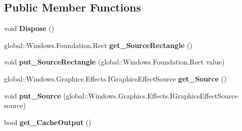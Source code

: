 \subsection*{Public Member Functions}
\begin{DoxyCompactItemize}
\item 
\mbox{\label{class_microsoft_1_1_graphics_1_1_canvas_1_1_effects_1_1_tile_effect_a82911fbdb206a47dd070948da25b15b2}} 
void {\bfseries Dispose} ()
\item 
\mbox{\label{class_microsoft_1_1_graphics_1_1_canvas_1_1_effects_1_1_tile_effect_ab1844baf6fd7b1291017af32256cb757}} 
global\+::\+Windows.\+Foundation.\+Rect {\bfseries get\+\_\+\+Source\+Rectangle} ()
\item 
\mbox{\label{class_microsoft_1_1_graphics_1_1_canvas_1_1_effects_1_1_tile_effect_a1a2a8a43669447290f1788aeafe2a795}} 
void {\bfseries put\+\_\+\+Source\+Rectangle} (global\+::\+Windows.\+Foundation.\+Rect value)
\item 
\mbox{\label{class_microsoft_1_1_graphics_1_1_canvas_1_1_effects_1_1_tile_effect_a7915c13a5ebe9c3c5289e7a8098f8c6a}} 
global\+::\+Windows.\+Graphics.\+Effects.\+I\+Graphics\+Effect\+Source {\bfseries get\+\_\+\+Source} ()
\item 
\mbox{\label{class_microsoft_1_1_graphics_1_1_canvas_1_1_effects_1_1_tile_effect_aba6942fe8fd59d19eb6ae826d403ca0a}} 
void {\bfseries put\+\_\+\+Source} (global\+::\+Windows.\+Graphics.\+Effects.\+I\+Graphics\+Effect\+Source source)
\item 
\mbox{\label{class_microsoft_1_1_graphics_1_1_canvas_1_1_effects_1_1_tile_effect_a34471e14ce7781b362ff9a33095823d1}} 
bool {\bfseries get\+\_\+\+Cache\+Output} ()
\item 
\mbox{\label{class_microsoft_1_1_graphics_1_1_canvas_1_1_effects_1_1_tile_effect_a0939a2d0898392b5bdc2e982fbeb6bb1}} 

\end{DoxyCompactItemize}
